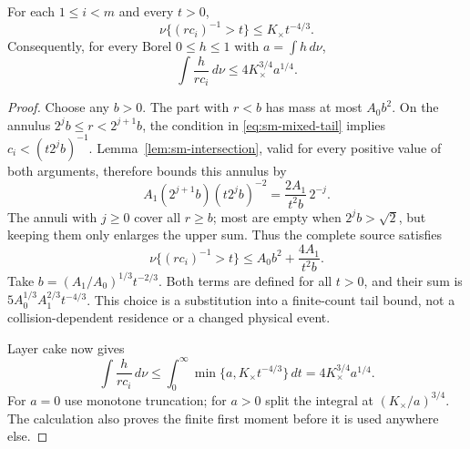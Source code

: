 \begin{lemma}
\label{lem:sm-mixed-tail}
For each $1\le i<m$ and every $t>0$,
\begin{equation}\label{eq:sm-mixed-tail}
 \nu\{(r c_i)^{-1}>t\}
                       \le K_\times t^{-4/3}.
\end{equation}
Consequently, for every Borel $0\le h\le1$ with
$a=\int h\,d\nu$,
\begin{equation}\label{eq:sm-mixed-functional}
 \int\frac{h}{r c_i}\,d\nu
                    \le4K_\times^{3/4}a^{1/4}.
\end{equation}
\end{lemma}
\begin{proof}
Choose any $b>0$.  The part with $r<b$ has mass at most $A_0b^2$.
On the annulus $2^j b\le r<2^{j+1}b$, the condition in
\eqref{eq:sm-mixed-tail} implies
$c_i<(t2^j b)^{-1}$.  Lemma~\ref{lem:sm-intersection}, valid
for every positive value of both arguments, therefore bounds
this annulus by
\[
 A_1(2^{j+1}b)(t2^jb)^{-2}
                     =\frac{2A_1}{t^2b}\,2^{-j}.
\]
The annuli with $j\ge0$ cover all $r\ge b$; most are empty
when $2^jb>\sqrt2$, but keeping them only enlarges the upper sum.
Thus the complete source satisfies
\[
 \nu\{(r c_i)^{-1}>t\}
       \le A_0b^2+\frac{4A_1}{t^2b}.
\]
Take $b=(A_1/A_0)^{1/3}t^{-2/3}$.  Both terms are defined for
all $t>0$, and their sum is
$5A_0^{1/3}A_1^{2/3}t^{-4/3}$.
This choice is a substitution into a finite-count tail bound, not
a collision-dependent residence or a changed physical event.

Layer cake now gives
\[
 \int\frac{h}{r c_i}\,d\nu
 \le\int_0^\infty\min\{a,K_\times t^{-4/3}\}\,dt
                 =4K_\times^{3/4}a^{1/4}.
\]
For $a=0$ use monotone truncation; for $a>0$ split the integral
at $(K_\times/a)^{3/4}$.  The calculation also proves the finite
first moment before it is used anywhere else.
\end{proof}

